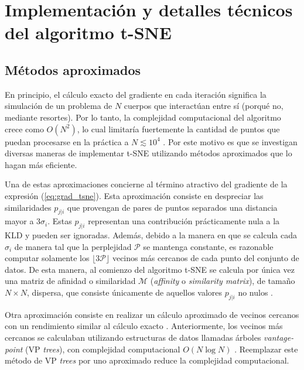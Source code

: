 \appendix
\chapter{Implementación y detalles técnicos del algoritmo t-SNE}\label{cha:apendice_tsne}

\section{Métodos aproximados}\label{sec:tsne_aprox}

En principio, el cálculo exacto del gradiente en cada iteración significa la simulación de un problema de $N$ cuerpos que interactúan entre sí (porqué no, mediante resortes). Por lo tanto, la complejidad computacional del algoritmo crece como $O(N^2)$, lo cual limitaría fuertemente la cantidad de puntos que puedan procesarse en la práctica a $N \lesssim 10^4$  \cite{linderman_tsne}. Por este motivo es que se investigan diversas maneras de implementar t-SNE utilizando métodos aproximados que lo hagan más eficiente.

Una de estas aproximaciones concierne al término atractivo del gradiente de la expresión (\ref{eq:grad_tsne}). Esta aproximación consiste en despreciar las similaridades $p_{j|i}$ que provengan de pares de puntos separados una distancia mayor a $3\sigma_i$. Estas $p_{j|i}$ representan una contribución prácticamente nula a la KLD y pueden ser ignoradas. Además, debido a la manera en que se calcula cada $\sigma_i$ de manera tal que la perplejidad $\mathcal{P}$ se mantenga constante, es razonable computar solamente los $\lfloor 3 \mathcal{P}\rfloor$ vecinos más cercanos de cada punto del conjunto de datos. De esta manera, al comienzo del algoritmo t-SNE se calcula por única vez una matriz de afinidad o similaridad $\mathcal{M}$ (\textit{affinity} o \textit{similarity matrix}), de tamaño $N \times N$, dispersa, que consiste únicamente de aquellos valores $p_{j|i}$ no nulos \cite{vdm_barnes-hut}.

Otra aproximación consiste en realizar un cálculo aproximado de vecinos cercanos con un rendimiento similar al cálculo exacto \cite{linderman_tsne}. Anteriormente, los vecinos más cercanos se calculaban utilizando estructuras de datos llamadas árboles \textit{vantage-point} (VP \textit{trees}), con complejidad computacional $O(N\log N)$ \cite{vdm_barnes-hut}. Reemplazar este método de VP \textit{trees} por uno aproximado reduce la complejidad computacional.


